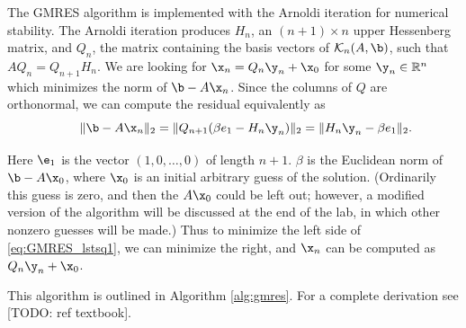 The GMRES algorithm is implemented with the Arnoldi iteration for numerical stability.
The Arnoldi iteration produces $H_n$, an $(n+1)\times n$ upper Hessenberg matrix, and $Q_n$, the matrix containing the basis vectors of $\mathcal{K}_n(A, \b)$, such that $AQ_n = Q_{n+1}H_n$.
We are looking for $\x_n = Q_n \y_n  + \x_0$ for some $\y_n \in \mathbb{R}^n$ which minimizes the norm of $\b - A\x_n$.
Since the columns of $Q$ are orthonormal, we can compute the residual equivalently as
\begin{equation}
\qquad \|\b - A\x_n\|_2 = \|Q_{n+1}(\beta e_1 - H_n \y_n)\|_2 = \|H_n \y_n - \beta e_1\|_2.
\label{eq:GMRES_lstsq1}
\end{equation}

Here $\e_1$ is the vector $(1, 0, \ldots, 0)$ of length $n+1$.  $\beta$ is the Euclidean norm of $\b - A\x_0$, where $\x_0$ is an initial arbitrary guess of the solution.  (Ordinarily this guess is zero, and then the $A\x_0$ could be left out; however, a modified version of the algorithm will be discussed at the end of the lab, in which other nonzero guesses will be made.)  Thus to minimize the left side of \ref{eq:GMRES_lstsq1}, we can minimize the right, and $\x_n $ can be computed as $ Q_n \y_n + \x_0$.

This algorithm is outlined in Algorithm \ref{alg:gmres}.
For a complete derivation see [TODO: ref textbook].


